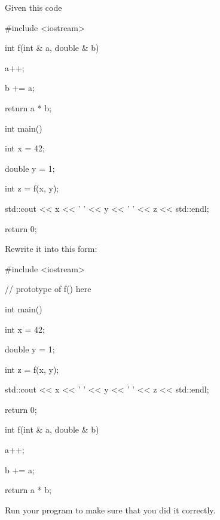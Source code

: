 Given this code



\begin{consolethree}[escapeinside=||]

#include <iostream>



int f(int & a, double & b)

{

    a++;

    b += a;

    return a * b;

}



int main()

{

    int x = 42;

    double y = 1;

    int z = f(x, y);

    std::cout << x << ' ' << y << ' ' << z << std::endl;

    return 0;

}

\end{consolethree}



Rewrite it into this form:



\begin{consolethree}[escapeinside=||]

#include <iostream>



// prototype of f() here



int main()

{

    int x = 42;

    double y = 1;

    int z = f(x, y);

    std::cout << x << ' ' << y << ' ' << z << std::endl;

    return 0;

}



int f(int & a, double & b)

{

    a++;

    b += a;

    return a * b;

}

\end{consolethree}



Run your program to make sure that you did it correctly.

